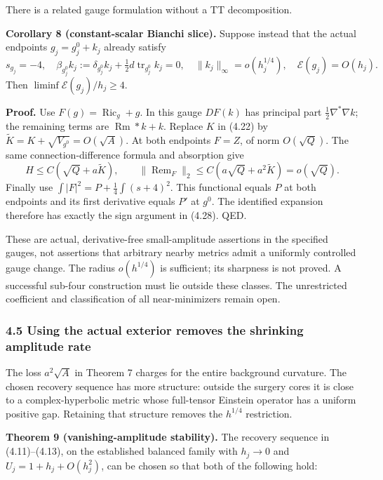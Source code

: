 \documentclass[
  10pt,
]{article}
\begin{document}
There is a related gauge formulation without a TT decomposition.

\textbf{Corollary 8 (constant-scalar Bianchi slice).} Suppose instead
that the actual endpoints \(g_j=g_j^0+k_j\) already satisfy \[
 s_{g_j}=-4,\quad
 \beta_{g_j^0}k_j
    :=\delta_{g_j^0}k_j+\tfrac12d\operatorname{tr}_{g_j^0}k_j=0,
 \quad \|k_j\|_\infty=o(h_j^{1/4}),\quad
 \mathcal E(g_j)=O(h_j).
 \tag{4.29}
\] Then \(\liminf\mathcal E(g_j)/h_j\ge4\).

\textbf{Proof.} Use \(F(g)=\operatorname{Ric}_g+g\). In this gauge
\(DF(k)\) has principal part \(\frac12\nabla^*\nabla k\); the remaining
terms are \(\operatorname{Rm}*k+k\). Replace \(K\) in (4.22) by
\(\widetilde K=K+\sqrt{V_{g^0}}=O(\sqrt A)\). At both endpoints \(F=Z\),
of norm \(O(\sqrt Q)\). The same connection-difference formula and
absorption give \[
 H\le C(\sqrt Q+a\widetilde K),\qquad
 \|\operatorname{Rem}_F\|_2
                  \le C(a\sqrt Q+a^2\widetilde K)=o(\sqrt Q).
\] Finally use \(\int|F|^2=P+\frac14\int(s+4)^2\). This functional
equals \(P\) at both endpoints and its first derivative equals \(P'\) at
\(g^0\). The identified expansion therefore has exactly the sign
argument in (4.28). QED.

These are actual, derivative-free small-amplitude assertions in the
specified gauges, not assertions that arbitrary nearby metrics admit a
uniformly controlled gauge change. The radius \(o(h^{1/4})\) is
sufficient; its sharpness is not proved. A successful sub-four
construction must lie outside these classes. The unrestricted
coefficient and classification of all near-minimizers remain open.

\hypertarget{using-the-actual-exterior-removes-the-shrinking-amplitude-rate}{%
\subsubsection{4.5 Using the actual exterior removes the shrinking
amplitude
rate}\label{using-the-actual-exterior-removes-the-shrinking-amplitude-rate}}

The loss \(a^2\sqrt A\) in Theorem 7 charges for the entire background
curvature. The chosen recovery sequence has more structure: outside the
surgery cores it is close to a complex-hyperbolic metric whose
full-tensor Einstein operator has a uniform positive gap. Retaining that
structure removes the \(h^{1/4}\) restriction.

\textbf{Theorem 9 (vanishing-amplitude stability).} The recovery
sequence in (4.11)--(4.13), on the established balanced family with
\(h_j\to0\) and \(U_j=1+h_j+O(h_j^2)\), can be chosen so that both of
the following hold:
\end{document}

